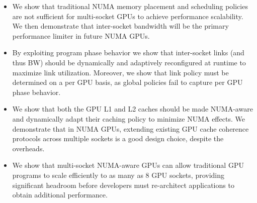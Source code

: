 \begin{itemize}

\item We show that traditional NUMA memory placement and 
scheduling policies are not sufficient for multi-socket GPUs to achieve 
performance scalability. We then demonstrate that inter-socket bandwidth will be 
the primary performance limiter in future NUMA GPUs.

\item By exploiting program phase behavior we show that inter-socket links (and 
thus BW) should be dynamically and adaptively reconfigured at runtime to maximize link 
utilization. Moreover, we show that link policy must be determined on a per 
GPU basis, as global policies fail to capture per GPU phase behavior.

\item We show that both the GPU L1 and L2 caches should be made NUMA-aware 
and dynamically adapt their caching policy to minimize NUMA effects. We demonstrate
that in NUMA GPUs, extending existing GPU cache coherence protocols
across multiple sockets is a good design choice, despite the overheads.

\item We show that multi-socket NUMA-aware GPUs can allow traditional 
GPU programs to scale efficiently to as many as 8 GPU sockets, providing significant 
headroom before developers must re-architect applications to obtain additional performance.

\end{itemize}

